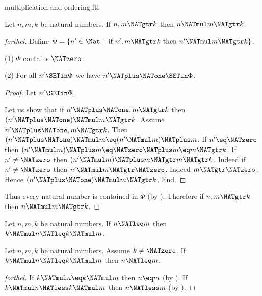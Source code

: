 \documentclass{stex}
\begin{document}
\begin{smodule}{multiplication-and-ordering.ftl}
\begin{proposition}[forthel,id=ARITHMETIC_06_1826268599287808]
  Let $n, m, k$ be natural numbers.
  If $n, m \NATgtr k$ then $n \NATmul m \NATgtr k$.
\end{proposition}
\begin{proof}[forthel]
  Define $\Phi = \{ n' \in \Nat \mid\text{ if }n', m \NATgtr k\text{ then }n' \NATmul m \NATgtr k \}$.

  (1) $\Phi$ contains $\NATzero$.

  (2) For all $n' \SETin \Phi$ we have $n' \NATplus \NATone \SETin \Phi$.
  \begin{proof}
    Let $n' \SETin \Phi$.

    Let us show that if $n' \NATplus \NATone, m \NATgtr k$ then $(n' \NATplus \NATone) \NATmul m \NATgtr k$.
      Assume $n' \NATplus \NATone, m \NATgtr k$.
      Then $(n' \NATplus \NATone) \NATmul m \eq (n' \NATmul m) \NATplus m$.
      If $n' \eq \NATzero$ then
      $(n' \NATmul m) \NATplus m
        \eq \NATzero \NATplus m
        \eq m
        \NATgtr k$.
      If $n' \neq \NATzero$ then
      $(n' \NATmul m) \NATplus m
        \NATgtr m
        \NATgtr k$.
      Indeed if $n' \neq \NATzero$ then $n' \NATmul m \NATgtr \NATzero$.
      Indeed $m \NATgtr \NATzero$.
      Hence $(n' \NATplus \NATone) \NATmul m \NATgtr k$.
    End.
  \end{proof}

  Thus every natural number is contained in $\Phi$ (by ).
  Therefore if $n, m \NATgtr k$ then $n \NATmul m \NATgtr k$.
\end{proof}

\begin{corollary}[forthel,id=ARITHMETIC_06_1751605544222720]
  Let $n, m, k$ be natural numbers.
  If $n \NATleq m$ then $k \NATmul n \NATleq k \NATmul m$.
\end{corollary}

\begin{corollary}[forthel,id=ARITHMETIC_06_3965209318260736]
  Let $n, m, k$ be natural numbers.
  Assume $k \neq \NATzero$.
  If $k \NATmul n \NATleq k \NATmul m$ then $n \NATleq m$.
\end{corollary}
\begin{proof}[forthel]
  If $k \NATmul n \eq k \NATmul m$ then $n \eq m$ (by ).
  If $k \NATmul n \NATless k \NATmul m$ then $n \NATless m$ (by ).
\end{proof}


\end{smodule}
\end{document}
